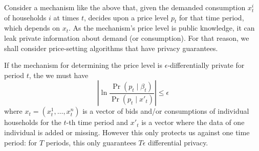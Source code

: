 \documentclass[a4paper,onecolumn]{article}
\numberwithin{algorithm}{section}
\theoremstyle{plain}
\theoremstyle{definition}
\theoremstyle{example}
\newcommand{\demand}{x}
\newcommand{\fdemand}{\beta}
\newcommand{\price}{p}
\begin{document}
Consider a mechanism like the above that, given the demanded consumption
$\demand_t^i$ of households $i$ at times $t$, decides upon a price
level $\price_{t}$ for that time period, which depends on
$\demand_{t}$. As the mechanism's price level is public knowledge, it
can leak private information about demand (or consumption). For that
reason, we shall consider price-setting algorithms that have privacy
guarantees.

If the mechanism for determining the price level is
$\epsilon$-differentially private for period $t$, the we must have
\[
\left|
  \ln \frac{\Pr(\price_t \mid \fdemand_t)}{\Pr(\price_t \mid x'_t)}
\right|
 \leq \epsilon
\]
where $\demand_t = (\demand^1_t, \ldots, \demand^n_t)$ is a vector of
bids and/or consumptions of individual households for the $t$-th time
period and $x'_t$ is a vector where the data of one individual is
added or missing.  However this only protects us against one time
period: for $T$ periods, this only guarantees $T \epsilon$
differential privacy.






\end{document}
